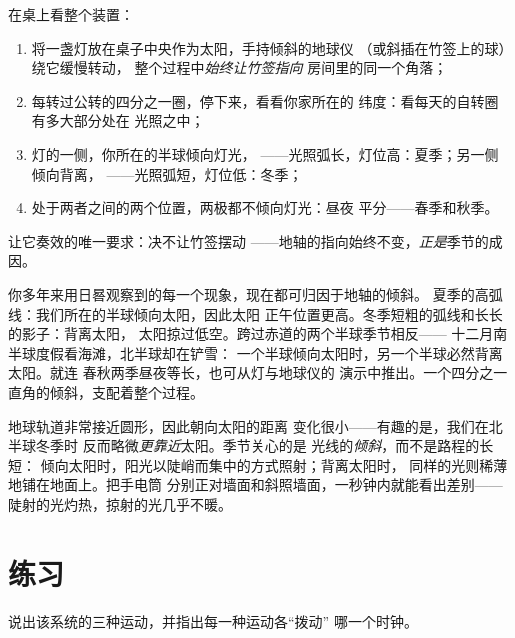 \begin{method}[地球仪与灯]\label{met:g6:sun-earth-moon:globe}
在桌上看整个装置：
\begin{enumerate}
  \item 将一盏灯放在桌子中央作为太阳，手持倾斜的地球仪
        （或斜插在竹签上的球）绕它缓慢转动，
        整个过程中\emph{始终让竹签指向}
        房间里的同一个角落；
  \item 每转过公转的四分之一圈，停下来，看看你家所在的
        纬度：看每天的自转圈有多大部分处在
        光照之中；
  \item 灯的一侧，你所在的半球倾向灯光，
        ——光照弧长，灯位高：夏季；另一侧倾向背离，
        ——光照弧短，灯位低：冬季；
  \item 处于两者之间的两个位置，两极都不倾向灯光：昼夜
        平分——春季和秋季。
\end{enumerate}
让它奏效的唯一要求：决不让竹签摆动
——地轴的指向始终不变，\emph{正是}季节的成因。
\end{method}

\begin{example}[旧线索的解释]\label{ex:g6:sun-earth-moon:clues}
你多年来用日晷观察到的每一个现象，现在都可归因于地轴的倾斜。
夏季的高弧线：我们所在的半球倾向太阳，因此太阳
正午位置更高。冬季短粗的弧线和长长的影子：背离太阳，
太阳掠过低空。跨过赤道的两个半球季节相反——
十二月南半球度假看海滩，北半球却在铲雪：
一个半球倾向太阳时，另一个半球必然背离太阳。就连
春秋两季昼夜等长，也可从灯与地球仪的
演示中推出。一个四分之一直角的倾斜，支配着整个过程。
\end{example}

\begin{remark}\label{rem:g6:sun-earth-moon:notdistance}
地球轨道非常接近圆形，因此朝向太阳的距离
变化很小——有趣的是，我们在北半球冬季时
反而略微\emph{更靠近}太阳。季节关心的是
光线的\emph{倾斜}，而不是路程的长短：
倾向太阳时，阳光以陡峭而集中的方式照射；背离太阳时，
同样的光则稀薄地铺在地面上。把手电筒
分别正对墙面和斜照墙面，一秒钟内就能看出差别——
陡射的光灼热，掠射的光几乎不暖。
\end{remark}

\section{练习}

\begin{exercise}[$\star$]\label{exo:g6:sun-earth-moon:1}
说出该系统的三种运动，并指出每一种运动各“拨动”
哪一个时钟。
\end{exercise}

